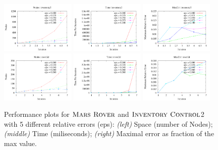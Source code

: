 \begin{figure}[tbph!]
\centering
\includegraphics[width=0.32\textwidth]{Figures/inventory/inventory2Nodes.pdf}
\hspace{1mm}
\includegraphics[width=0.32\textwidth]{Figures/inventory/inventory2Time.pdf}
\hspace{1mm}
\includegraphics[width=0.32\textwidth]{Figures/inventory/inventory2MaxErr.pdf}
\\
\vspace{5mm}
\includegraphics[width=0.32\textwidth]{Figures/rover2D/rover2d-Nodes.pdf}
\hspace{1mm}
\includegraphics[width=0.32\textwidth]{Figures/rover2D/rover2d-Time.pdf}
\hspace{1mm}
\includegraphics[width=0.32\textwidth]{Figures/rover2D/rover2d-MaxErr.pdf}
\caption{\footnotesize Performance plots for $\textsc{Mars Rover}$ and $\textsc{Inventory Control}$2 with 5 different relative errors (eps):
{\it (left)}  Space (number of Nodes);
{\it (middle)} Time (miliseconds);
{\it (right)} Maximal error as fraction of the max value.
}
\label{fig:Value}
\vspace{-5mm}
\end{figure}


